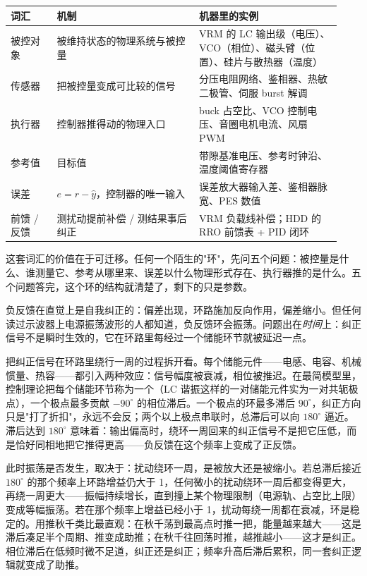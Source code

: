 \begin{longtable}{L{0.13\linewidth}L{0.40\linewidth}L{0.40\linewidth}}
\toprule
词汇 & 机制 & 机器里的实例 \\
\midrule
被控对象 & 被维持状态的物理系统与被控量 & VRM 的 LC 输出级（电压）、VCO（相位）、磁头臂（位置）、硅片与散热器（温度） \\
传感器 & 把被控量变成可比较的信号 & 分压电阻网络、鉴相器、热敏二极管、伺服 burst 解调 \\
执行器 & 控制器推得动的物理入口 & buck 占空比、VCO 控制电压、音圈电机电流、风扇 PWM \\
参考值 & 目标值 & 带隙基准电压、参考时钟沿、温度阈值寄存器 \\
误差 & $e = r - \hat{y}$，控制器的唯一输入 & 误差放大器输入差、鉴相器脉宽、PES 数值 \\
前馈 / 反馈 & 测扰动提前补偿 / 测结果事后纠正 & VRM 负载线补偿；HDD 的 RRO 前馈表 + PID 闭环 \\
\bottomrule
\end{longtable}

这套词汇的价值在于可迁移。任何一个陌生的"环"，先问五个问题：被控量是什么、谁测量它、参考从哪里来、误差以什么物理形式存在、执行器推的是什么。五个问题答完，这个环的结构就清楚了，剩下的只是参数。


负反馈在直觉上是自我纠正的：偏差出现，环路施加反向作用，偏差缩小。但任何读过示波器上电源振荡波形的人都知道，负反馈环会振荡。问题出在\emph{时间}上：纠正信号不是瞬时生效的，它在环路里每经过一个储能环节就被延迟一点。

把纠正信号在环路里绕行一周的过程拆开看。每个储能元件——电感、电容、机械惯量、热容——都引入两种效应：信号幅度被衰减，相位被推迟。在最简模型里，控制理论把每个储能环节称为一个（LC 谐振这样的一对储能元件实为一对共轭极点），一个极点最多贡献 $-90^{\circ}$ 的相位滞后。一个极点的环最多滞后 $90^{\circ}$，纠正方向只是"打了折扣"，永远不会反；两个以上极点串联时，总滞后可以向 $180^{\circ}$ 逼近。滞后达到 $180^{\circ}$ 意味着：输出偏高时，绕环一周回来的纠正信号不是把它压低，而是恰好同相地把它推得更高——负反馈在这个频率上变成了正反馈。

此时振荡是否发生，取决于：扰动绕环一周，是被放大还是被缩小。若总滞后接近 $180^{\circ}$ 的那个频率上环路增益仍大于 1，任何微小的扰动绕环一周后都变得更大，再绕一周更大——振幅持续增长，直到撞上某个物理限制（电源轨、占空比上限）变成等幅振荡。若在那个频率上增益已经小于 1，扰动每绕一周都在衰减，环是稳定的。用推秋千类比最直观：在秋千荡到最高点时推一把，能量越来越大——这是滞后凑足半个周期、推变成助推；在秋千往回荡时推，越推越小——这才是纠正。相位滞后在低频时微不足道，纠正还是纠正；频率升高后滞后累积，同一套纠正逻辑就变成了助推。

